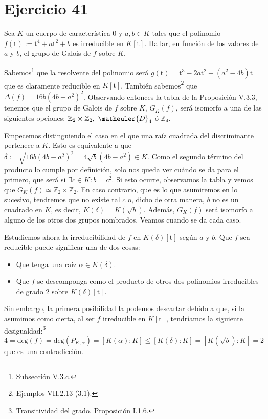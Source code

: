 \section{Ejercicio 41}
\begin{enun}
    Sea $K$ un cuerpo de característica $0$ y $a, b \in K$ tales que el polinomio $f\left( \mathrm{t} \right) := \mathrm{t}^4 + a \mathrm{t}^2 + b$ es irreducible en $K\left[\mathrm{t}\right]$.
    Hallar, en función de los valores de $a$ y $b$, el grupo de Galois de $f$ sobre $K$.
\end{enun}

\begin{sol}
    Sabemos\footnote{Subsección V.3.c\cite{cuerpos}.} que la resolvente del polinomio será $g\left( \mathrm{t} \right) = \mathrm{t}^3 - 2a \mathrm{t}^2 + \left( a^2 - 4b \right)\mathrm{t}$ que es claramente reducible en $K\left[\mathrm{t}\right]$. También sabemos\footnote{Ejemplos VII.2.13 (3.1)\cite{anillos}.} que $\Delta\left( f \right) = 16b\left( 4b - a^2 \right)^2$. Observando entonces la tabla de la Proposición V.3.3\cite{cuerpos}, tenemos que el grupo de Galois de $f$ sobre $K$, $G_K\left( f \right)$, será isomorfo a una de las siguientes opciones: $\mathbb{Z}_2 \times \mathbb{Z}_2,\ \matheuler{D}_4$ ó $\mathbb{Z}_4$.

    Empecemos distinguiendo el caso en el que una raíz cuadrada del discriminante pertenece a $K$. Esto es equivalente a que $\delta := \sqrt{16b\left( 4b - a^2 \right)^2} = 4 \sqrt{b} \left( 4b - a^2 \right) \in K$. Como el segundo término del producto lo cumple por definición, solo nos queda ver cuándo se da para el primero, que será si $\exists c \in K : b = c^2$. Si esto ocurre, observamos la tabla y vemos que $\boxed{G_K\left( f \right) \simeq \mathbb{Z}_2 \times \mathbb{Z}_2}$. En caso contrario, que es lo que asumiremos en lo sucesivo, tendremos que no existe tal $c$ o, dicho de otra manera, $b$ no es un cuadrado en $K$, es decir, $K\left( \delta \right) = K\left( \sqrt{b} \right)$. Además, $G_K\left( f \right)$ será isomorfo a alguno de los otros dos grupos nombrados. Veamos cuando se da cada caso.

    Estudiemos ahora la irreducibilidad de $f$ en $K\left( \delta \right)\left[ \mathrm{t} \right]$ según $a$ y $b$. Que $f$ sea reducible puede significar una de dos cosas:
    \begin{itemize}
        \item Que tenga una raíz $\alpha \in K\left( \delta \right)$.
        \item Que $f$ se descomponga como el producto de otros dos polinomios irreducibles de grado $2$ sobre $K\left( \delta \right)\left[ \mathrm{t} \right]$.
    \end{itemize}
    Sin embargo, la primera posibilidad la podemos descartar debido a que, si la asumimos como cierta, al ser $f$ irreducible en $K\left[ \mathrm{t} \right]$, tendríamos la siguiente desigualdad:\footnote{Transitividad del grado. Proposición I.1.6\cite{cuerpos}.}
    \[
    4 = \mathrm{deg}\left( f \right) = \mathrm{deg}\left( P_{K, \alpha} \right) = \left[ K\left( \alpha \right) : K \right] \le \left[ K\left( \delta \right) : K \right] = \left[ K\left( \sqrt{b} \right) : K \right] = 2
    \]
    que es una contradicción.


\end{sol}
